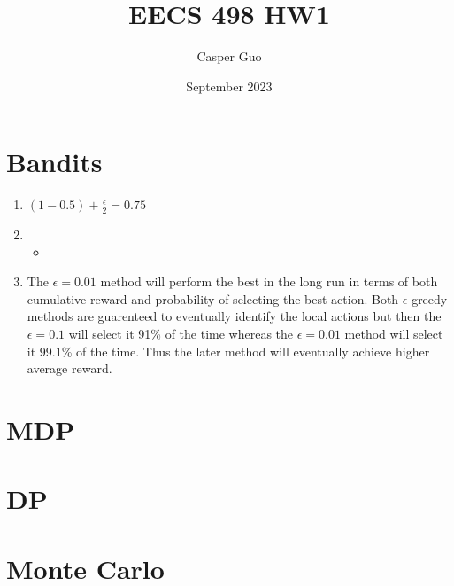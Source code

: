 \documentclass{article}
\title{EECS 498 HW1}
\author{Casper Guo}
\date{September 2023}
\begin{document}
\maketitle

\section{Bandits}
\begin{enumerate}
    \item $(1 - 0.5) + \frac{\epsilon}{2} = 0.75$
    \item 
        \begin{itemize}
        \item 
        \end{itemize} 
    \item The $\epsilon = 0.01$ method will perform the best in the long run in terms of both cumulative reward and probability of selecting the best action. Both $\epsilon$-greedy methods are guarenteed to eventually identify the local actions but then the $\epsilon = 0.1$ will select it 91\% of the time whereas the $\epsilon = 0.01$ method will select it 99.1\% of the time. Thus the later method will eventually achieve higher average reward.
\end{enumerate}

\section{MDP}

\section{DP}

\section{Monte Carlo}
\end{document}
